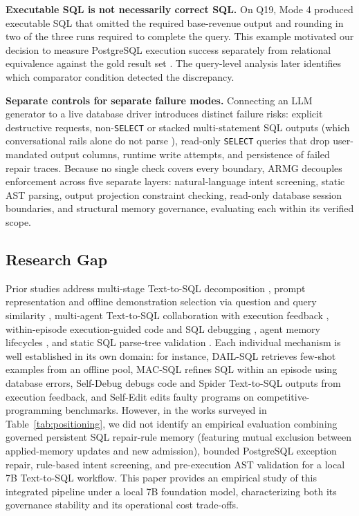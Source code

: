 \textbf{Executable SQL is not necessarily correct SQL.} On Q19, Mode 4 produced executable SQL that omitted the required base-revenue output and rounding in two of the three runs required to complete the query. This example motivated our decision to measure PostgreSQL execution success separately from relational equivalence against the gold result set \cite{finegandollak2018eval, zhong2020distilled}. The query-level analysis later identifies which comparator condition detected the discrepancy.

\textbf{Separate controls for separate failure modes.} Connecting an LLM generator to a live database driver introduces distinct failure risks: explicit destructive requests, non-\texttt{SELECT} or stacked multi-statement SQL outputs \cite{mao2023sqlglot, halfond2005amnesia} (which conversational rails alone do not parse \cite{rebedea2023nemoguardrails}), read-only \texttt{SELECT} queries that drop user-mandated output columns, runtime write attempts, and persistence of failed repair traces. Because no single check covers every boundary, ARMG decouples enforcement across five separate layers: natural-language intent screening, static AST parsing, output projection constraint checking, read-only database session boundaries, and structural memory governance, evaluating each within its verified scope.

\subsection{Research Gap}
Prior studies address multi-stage Text-to-SQL decomposition \cite{pourreza2023dinsql}, prompt representation and offline demonstration selection via question and query similarity \cite{gao2024dailsql}, multi-agent Text-to-SQL collaboration with execution feedback \cite{wang2025macsql}, within-episode execution-guided code and SQL debugging \cite{wang2018executionguided, madaan2023selfrefine, chen2024selfdebug, zhang2023selfedit}, agent memory lifecycles \cite{shinn2023reflexion, park2023generativeagents, packer2023memgpt, sumers2024coala}, and static SQL parse-tree validation \cite{halfond2005amnesia, mao2023sqlglot}. Each individual mechanism is well established in its own domain: for instance, DAIL-SQL \cite{gao2024dailsql} retrieves few-shot examples from an offline pool, MAC-SQL \cite{wang2025macsql} refines SQL within an episode using database errors, Self-Debug \cite{chen2024selfdebug} debugs code and Spider Text-to-SQL outputs from execution feedback, and Self-Edit \cite{zhang2023selfedit} edits faulty programs on competitive-programming benchmarks. However, in the works surveyed in Table~\ref{tab:positioning}, we did not identify an empirical evaluation combining governed persistent SQL repair-rule memory (featuring mutual exclusion between applied-memory updates and new admission), bounded PostgreSQL exception repair, rule-based intent screening, and pre-execution AST validation for a local 7B Text-to-SQL workflow. This paper provides an empirical study of this integrated pipeline under a local 7B foundation model, characterizing both its governance stability and its operational cost trade-offs.

